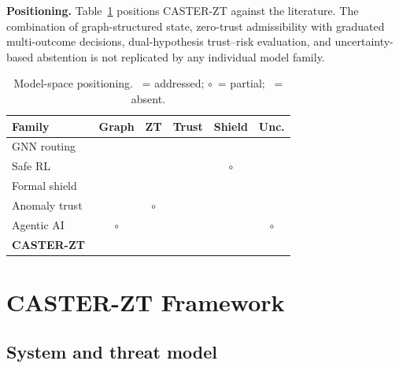\documentclass[lettersize,journal]{IEEEtran}
\newcommand{\cmark}{\ding{51}}
\newcommand{\xmark}{\ding{55}}
\newcommand{\pmark}{{\footnotesize$\circ$}}
\begin{document}
\noindent\textbf{Positioning.}
Table~\ref{tab:model_positioning} positions CASTER-ZT against the literature.
The combination of graph-structured state, zero-trust admissibility with graduated multi-outcome decisions, dual-hypothesis trust--risk evaluation, and uncertainty-based abstention is not replicated by any individual model family.

\begin{table}[t]
\centering
\caption{Model-space positioning. \cmark\ = addressed; \pmark\ = partial; \xmark\ = absent.}
\label{tab:model_positioning}
\footnotesize
\begin{tabular}{lccccc}
\toprule
Family & Graph & ZT & Trust & Shield & Unc. \\
\midrule
GNN routing~\cite{almasan2022deep,rusek2020routenet} & \cmark & \xmark & \xmark & \xmark & \xmark \\
Safe RL~\cite{achiam2017cpo,dai2024saferlhf} & \xmark & \xmark & \xmark & \pmark & \xmark \\
Formal shield~\cite{alshiekh2018shielding,roderick2024dmps} & \xmark & \xmark & \xmark & \cmark & \xmark \\
Anomaly trust~\cite{zahoor2025ifocsvm,haque2023dbscanwsn} & \xmark & \pmark & \cmark & \xmark & \xmark \\
Agentic AI~\cite{toward_autonomous_oran_2026,demirel2026agentic} & \pmark & \xmark & \xmark & \xmark & \pmark \\
\textbf{CASTER-ZT} & \cmark & \cmark & \cmark & \cmark & \cmark \\
\bottomrule
\end{tabular}
\end{table}


\section{CASTER-ZT Framework}
\label{sec:framework}

\subsection{System and threat model}
\label{sec:threat_model}
\end{document}
